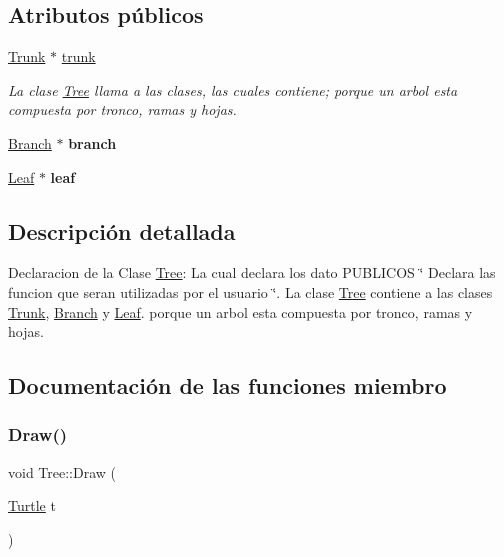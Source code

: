 \subsection*{Atributos públicos}
\begin{DoxyCompactItemize}
\item 
\mbox{\hyperlink{class_trunk}{Trunk}} $\ast$ \mbox{\hyperlink{class_tree_a76114813e02925c4decabe9f837a02a9}{trunk}}
\begin{DoxyCompactList}\small\item\em La clase \mbox{\hyperlink{class_tree}{Tree}} llama a las clases, las cuales contiene; porque un arbol esta compuesta por tronco, ramas y hojas. \end{DoxyCompactList}\item 
\mbox{\label{class_tree_a56e2e117486ac449000deab0efac4a1e}} 
\mbox{\hyperlink{class_branch}{Branch}} $\ast$ {\bfseries branch}
\item 
\mbox{\label{class_tree_a4b20e3eadca4c054d79eb7a57579806f}} 
\mbox{\hyperlink{class_leaf}{Leaf}} $\ast$ {\bfseries leaf}
\end{DoxyCompactItemize}


\subsection{Descripción detallada}
Declaracion de la Clase \mbox{\hyperlink{class_tree}{Tree}}\+: La cual declara los dato P\+U\+B\+L\+I\+C\+OS \char`\"{} Declara las funcion que seran utilizadas por el usuario \char`\"{}. La clase \mbox{\hyperlink{class_tree}{Tree}} contiene a las clases \mbox{\hyperlink{class_trunk}{Trunk}}, \mbox{\hyperlink{class_branch}{Branch}} y \mbox{\hyperlink{class_leaf}{Leaf}}. porque un arbol esta compuesta por tronco, ramas y hojas. 

\subsection{Documentación de las funciones miembro}
\mbox{\label{class_tree_a3dbf11ce8a221969b976bc0e5ba7f6af}} 
\subsubsection{\texorpdfstring{Draw()}{Draw()}}
{\footnotesize\ttfamily void Tree\+::\+Draw (\begin{DoxyParamCaption}\item[{\mbox{\hyperlink{class_turtle}{Turtle}}}]{t }\end{DoxyParamCaption})\hspace{0.3cm}{\ttfamily [inline]}}



